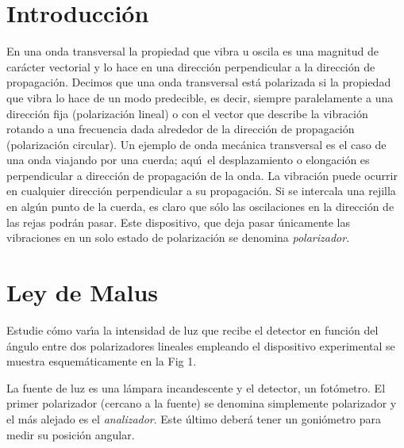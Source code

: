 \documentclass[laboratorio]{guia}
\begin{document}
\maketitle

\section{Introducci\'on}
En una onda transversal la propiedad que vibra u oscila es una magnitud de 
car\'acter vectorial y lo hace en una direcci\'on perpendicular a la 
direcci\'on de propagaci\'on. Decimos que una onda transversal est\'a 
polarizada si la propiedad que vibra lo hace de un modo predecible, es decir,
siempre paralelamente a una direcci\'on fija (polarizaci\'on lineal) o con el
vector que describe la vibraci\'on rotando a una frecuencia dada alrededor de
la direcci\'on de propagaci\'on (polarizaci\'on circular). Un ejemplo de onda
mec\'anica transversal es el caso de una onda viajando por una cuerda; aqu\'\i\
el desplazamiento o elongaci\'on es perpendicular a direcci\'on de 
propagaci\'on de la onda. La vibraci\'on puede ocurrir en cualquier direcci\'on
perpendicular a su propagaci\'on. Si se intercala una rejilla en alg\'un punto
de la cuerda, es claro que s\'olo las oscilaciones en la direcci\'on de las 
rejas podr\'an pasar. Este dispositivo, que deja pasar \'unicamente las 
vibraciones en un solo estado de polarizaci\'on se denomina {\it polarizador}.

\section{Ley de Malus}
Estudie c\'omo var\'\i a la intensidad de luz que recibe el detector en 
funci\'on del \'angulo entre dos polarizadores lineales empleando el 
dispositivo experimental se muestra esquem\'aticamente en la Fig 1.

La fuente de luz es una l\'ampara incandescente y el detector, un fot\'ometro.
El primer polarizador (cercano a la fuente) se denomina simplemente polarizador
y el m\'as alejado es el {\it analizador}. Este \'ultimo deber\'a tener un 
goni\'ometro para medir su posici\'on angular.
\end{document}
